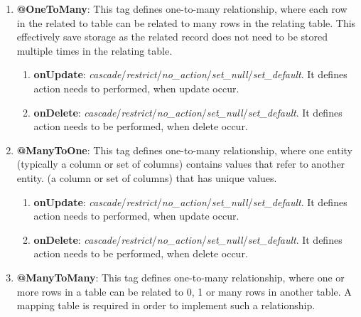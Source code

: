 \begin{enumerate}
\begin{enumerate}
		\end{enumerate}


	\item \small \textbf{@OneToMany}: This tag defines one-to-many relationship, where each row in the related to table can be related to many rows in the relating table. This effectively save storage as the related record does not need to be stored multiple times in the relating table.
	
		\begin{enumerate}

			\item \small \textbf{onUpdate}: \textit{cascade}/\textit{restrict}/\textit{no\_action}/\textit{set\_null}/\textit{set\_default}. It defines action needs to performed, when update occur. 
			\item \small \textbf{onDelete}: \textit{cascade}/\textit{restrict}/\textit{no\_action}/\textit{set\_null}/\textit{set\_default}. It defines action needs to be performed, when delete occur.		

		\end{enumerate}

	\item \small \textbf{@ManyToOne}: This tag defines one-to-many relationship, where one entity (typically a column or set of columns) contains values that refer to another entity. (a column or set of columns) that has unique values.
	

		\begin{enumerate}

			\item \small \textbf{onUpdate}: \textit{cascade}/\textit{restrict}/\textit{no\_action}/\textit{set\_null}/\textit{set\_default}. It defines action needs to performed, when update occur. 
			\item \small \textbf{onDelete}: \textit{cascade}/\textit{restrict}/\textit{no\_action}/\textit{set\_null}/\textit{set\_default}. It defines action needs to be performed, when delete occur.		

		\end{enumerate}

	\item \small \textbf{@ManyToMany}: This tag defines one-to-many relationship, where one or more rows in a table can be related to 0, 1 or many rows in another table. A mapping table is required in order to implement such a relationship.

		\begin{enumerate}


\end{enumerate}
\end{enumerate}
